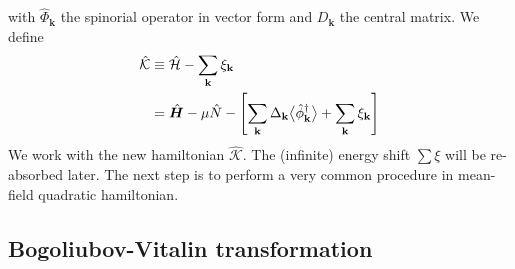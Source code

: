 with $\hat{\Phi}_\mathbf{k}$ the spinorial operator in vector form and $D_\mathbf{k}$ the central matrix. We define
\begin{align}
	\hat{\mathcal{K}} &\equiv \hat{\mathcal{H}} - \sum_\mathbf{k} \xi_\mathbf{k} \nonumber \\
	&= \hat{\bm H} - \mu\hat{N} - \left[{\sum_\mathbf{k} \Delta_\mathbf{k} \big\langle \hat{\phi}_\mathbf{k}^\dagger \big\rangle + \sum_\mathbf{k} \xi_\mathbf{k}}\right] \label{eq:definition of bogoliubov kamiltonian}
\end{align}
We work with the new hamiltonian $\hat{\mathcal{K}}$. The (infinite) energy shift $\sum \xi$ will be re-absorbed later. The next step is to perform a very common procedure in mean-field quadratic hamiltonian.

\subsection{Bogoliubov-Vitalin transformation}

